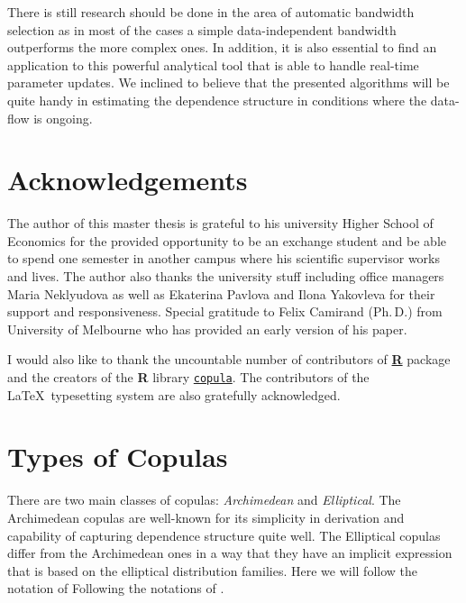 \documentclass[12pt]{article}
\begin{document}
	There is still research should be done in the area of automatic bandwidth selection as in most of the cases a simple data-independent bandwidth outperforms the more complex ones. In addition, it is also essential to find an application to this powerful analytical tool that is able to handle real-time parameter updates. We inclined to believe that the presented algorithms will be quite handy in estimating the dependence structure in conditions where the data-flow is ongoing.
	
	\section*{Acknowledgements}
	
	The author of this master thesis is grateful to his university Higher School of Economics for the provided opportunity to be an exchange student and be able to spend one semester in another campus where his scientific supervisor works and lives. The author also thanks the university stuff including office managers Maria Neklyudova as well as Ekaterina Pavlova and Ilona Yakovleva for their support and responsiveness. Special gratitude to Felix Camirand (Ph.\,D.) from University of Melbourne who has provided an early version of his paper.
	
	I would also like to thank the uncountable number of contributors of \href{https://R-project.org/}{\textbf{R}} package and the creators of the \textbf{R} library \href{https://cran.r-project.org/web/packages/copula/copula.pdf}{\texttt{copula}}. The contributors of the \LaTeX~typesetting system are also gratefully acknowledged. 
	
	\nocite{R} \nocite{Rcopula1} \nocite{Rcopula2} \nocite{Rcopula3} \nocite{Rcopula4}
	
	\printbibliography
	\pagebreak
	\appendix
	\section{Types of Copulas}\label{sec:copula_types}
	
	There are two main classes of copulas: \textit{Archimedean} and \textit{Elliptical}. The Archimedean copulas are well-known for its simplicity in derivation and capability of capturing dependence structure quite well. The Elliptical copulas differ from the Archimedean ones in a way that they have an implicit expression that is based on the elliptical distribution families. Here we will follow the notation of Following the notations of \textcite{Hyrs2015}.
	
\end{document}
